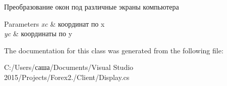 Преобразование окон под различные экраны компьютера 


\begin{DoxyParams}{Parameters}
{\em xc} & координат по x\\
\hline
{\em yc} & координаты по y\\
\hline
\end{DoxyParams}


The documentation for this class was generated from the following file\+:\begin{DoxyCompactItemize}
\item 
C\+:/\+Users/саша/\+Documents/\+Visual Studio 2015/\+Projects/\+Forex2./\+Client/Display.\+cs\end{DoxyCompactItemize}
